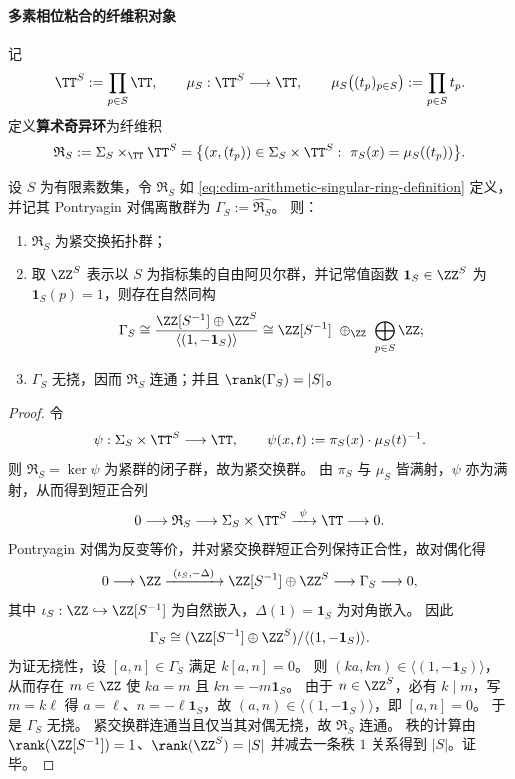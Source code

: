 \paragraph{多素相位粘合的纤维积对象}
记
\[
\TT^{S}:=\prod_{p\in S}\TT,
\qquad
\mu_S:\TT^{S}\longrightarrow \TT,
\qquad
\mu_S\bigl((t_p)_{p\in S}\bigr):=\prod_{p\in S} t_p.
\]
定义\textbf{算术奇异环}为纤维积
\begin{equation}\label{eq:cdim-arithmetic-singular-ring-definition}
\mathfrak{R}_S
:=\Sigma_S\times_{\TT}\TT^{S}
=\bigl\{(x,(t_p))\in\Sigma_S\times\TT^{S}:\ \pi_S(x)=\mu_S((t_p))\bigr\}.
\end{equation}

\begin{theorem}[算术奇异环的对偶刻画与连通性]\label{thm:cdim-arithmetic-singular-ring-dual-connected}
设 \(S\) 为有限素数集，令 \(\mathfrak{R}_S\) 如 \eqref{eq:cdim-arithmetic-singular-ring-definition} 定义，并记其 Pontryagin 对偶离散群为
\(
\Gamma_S:=\widehat{\mathfrak{R}_S}
\)。
则：
\begin{enumerate}
  \item \(\mathfrak{R}_S\) 为紧交换拓扑群；
  \item 取 \(\ZZ^{S}\) 表示以 \(S\) 为指标集的自由阿贝尔群，并记常值函数 \(\mathbf{1}_S\in\ZZ^{S}\) 为 \(\mathbf{1}_S(p)=1\)，则存在自然同构
  \[
  \Gamma_S
  \cong
  \frac{\ZZ[S^{-1}]\oplus \ZZ^{S}}{\langle(1,-\mathbf{1}_S)\rangle}
  \cong
  \ZZ[S^{-1}]\ \oplus_{\ZZ}\ \bigoplus_{p\in S}\ZZ;
  \]
  \item \(\Gamma_S\) 无挠，因而 \(\mathfrak{R}_S\) 连通；并且 \(\rank(\Gamma_S)=|S|\)。
\end{enumerate}
\end{theorem}
\begin{proof}
令
\[
\psi:\Sigma_S\times \TT^{S}\longrightarrow \TT,
\qquad
\psi(x,t):=\pi_S(x)\cdot \mu_S(t)^{-1}.
\]
则 \(\mathfrak{R}_S=\ker\psi\) 为紧群的闭子群，故为紧交换群。
由 \(\pi_S\) 与 \(\mu_S\) 皆满射，\(\psi\) 亦为满射，从而得到短正合列
\[
0\longrightarrow \mathfrak{R}_S
\longrightarrow \Sigma_S\times \TT^{S}
\xrightarrow{\ \psi\ }
\TT
\longrightarrow 0.
\]
Pontryagin 对偶为反变等价，并对紧交换群短正合列保持正合性，故对偶化得
\[
0\longrightarrow \ZZ
\xrightarrow{\ (\iota_S,-\Delta)\ }
\ZZ[S^{-1}]\oplus \ZZ^{S}
\longrightarrow \Gamma_S
\longrightarrow 0,
\]
其中 \(\iota_S:\ZZ\hookrightarrow\ZZ[S^{-1}]\) 为自然嵌入，\(\Delta(1)=\mathbf{1}_S\) 为对角嵌入。
因此
\[
\Gamma_S\cong (\ZZ[S^{-1}]\oplus \ZZ^{S})/\langle(1,-\mathbf{1}_S)\rangle.
\]
为证无挠性，设 \([a,n]\in\Gamma_S\) 满足 \(k[a,n]=0\)。
则 \((ka,kn)\in\langle(1,-\mathbf{1}_S)\rangle\)，从而存在 \(m\in\ZZ\) 使
\(
ka=m
\)
且
\(
kn=-m\mathbf{1}_S
\)。
由于 \(n\in\ZZ^{S}\)，必有 \(k\mid m\)，写 \(m=k\ell\) 得 \(a=\ell\)、\(n=-\ell\mathbf{1}_S\)，故 \((a,n)\in\langle(1,-\mathbf{1}_S)\rangle\)，即 \([a,n]=0\)。
于是 \(\Gamma_S\) 无挠。
紧交换群连通当且仅当其对偶无挠，故 \(\mathfrak{R}_S\) 连通。
秩的计算由 \(\rank(\ZZ[S^{-1}])=1\)、\(\rank(\ZZ^{S})=|S|\) 并减去一条秩 \(1\) 关系得到 \(|S|\)。证毕。
\end{proof}

